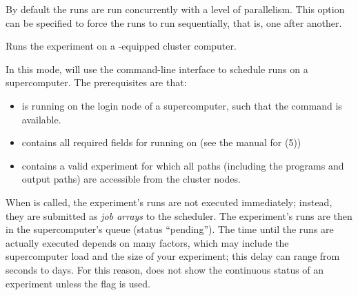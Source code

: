 \documentclass[a4paper,english]{article}
\begin{document}
\begin{adjustwidth}{18pt}{0pt}
\begin{Description}[Subcommands]
\begin{Description}[Options]
                                \item[\oOpt{\ddash sequential}]
                                  By default the runs are run concurrently with a level of parallelism. This option
                                  can be specified to force the runs to run sequentially, that is, one after another.
                            \end{Description}

                    \item[\Arg{slurm}]
                        Runs the experiment on a -equipped cluster computer.

                        In this mode,  will use the  command-line
                        interface to schedule runs on a supercomputer.
                        The prerequisites are that:
                        \begin{itemize}
                            \item {} is running on the login node of a supercomputer, such
                                  that the  command is available.
                            \item {} contains all required fields for running on
                                   (see the manual for (5))
                            \item {} contains a valid experiment for which all
                                  paths (including the programs and output paths) are accessible
                                  from the cluster nodes.
                        \end{itemize}

                        When    is called, the experiment's runs
                        are not executed immediately; instead, they are submitted as \emph{job arrays}
                        to the  scheduler.
                        The experiment's runs are then in the supercomputer's queue (status ``pending'').
                        The time until the runs are actually executed depends on many factors, which
                        may include the supercomputer load and the size of your experiment; this
                        delay can range from seconds to days.
                        For this reason,    does not show the
                        continuous status of an experiment unless the  flag is
                        used.


\end{Description}
\end{adjustwidth}
\end{document}
